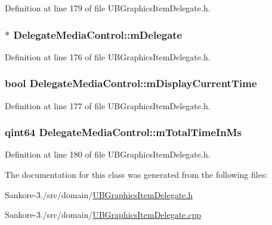 Definition at line 179 of file U\-B\-Graphics\-Item\-Delegate.\-h.

\hypertarget{class_delegate_media_control_a8a08cfff7b99e4dca1ea7e0cd9f0c097}{
\subsubsection[{m\-Delegate}]{$\ast$ Delegate\-Media\-Control\-::m\-Delegate\hspace{0.3cm}{\ttfamily [protected]}}}\label{df/d0d/class_delegate_media_control_a8a08cfff7b99e4dca1ea7e0cd9f0c097}


Definition at line 176 of file U\-B\-Graphics\-Item\-Delegate.\-h.

\hypertarget{class_delegate_media_control_a06fd542ee0278e369a39b9158f0acb35}{
\subsubsection[{m\-Display\-Current\-Time}]{\setlength{\rightskip}{0pt plus 5cm}bool Delegate\-Media\-Control\-::m\-Display\-Current\-Time\hspace{0.3cm}{\ttfamily [protected]}}}\label{df/d0d/class_delegate_media_control_a06fd542ee0278e369a39b9158f0acb35}


Definition at line 177 of file U\-B\-Graphics\-Item\-Delegate.\-h.

\hypertarget{class_delegate_media_control_a31ae1114209781ed2921257c16219392}{
\subsubsection[{m\-Total\-Time\-In\-Ms}]{\setlength{\rightskip}{0pt plus 5cm}qint64 Delegate\-Media\-Control\-::m\-Total\-Time\-In\-Ms\hspace{0.3cm}{\ttfamily [protected]}}}\label{df/d0d/class_delegate_media_control_a31ae1114209781ed2921257c16219392}


Definition at line 180 of file U\-B\-Graphics\-Item\-Delegate.\-h.



The documentation for this class was generated from the following files\-:\begin{DoxyCompactItemize}
\item 
Sankore-\/3./src/domain/\hyperlink{_u_b_graphics_item_delegate_8h}{U\-B\-Graphics\-Item\-Delegate.\-h}\item 
Sankore-\/3./src/domain/\hyperlink{_u_b_graphics_item_delegate_8cpp}{U\-B\-Graphics\-Item\-Delegate.\-cpp}\end{DoxyCompactItemize}
